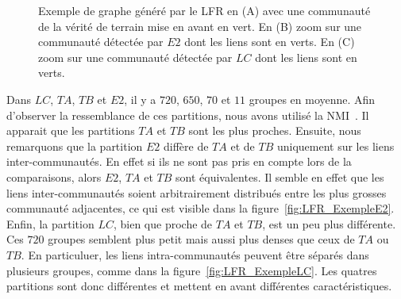 \begin{figure}
\centering

	\caption{Exemple de graphe généré par le LFR en (A) avec une communauté de la vérité de terrain mise en avant en vert.
	En (B) zoom sur une communauté détectée par $E2$ dont les liens sont en verts.
	En (C) zoom sur une communauté détectée par $LC$ dont les liens sont en verts. }
	\label{fig:LFR_Exemple}
\end{figure}


Dans $LC$, $TA$, $TB$ et $E2$, il y a $720$, $650$, $70$ et $11$ groupes en moyenne.
Afin d'observer la ressemblance de ces partitions, nous avons utilisé la NMI~\cite{Danon2005}.
Il apparait que les partitions $TA$ et $TB$ sont les plus proches.
Ensuite, nous remarquons que la partition $E2$ diffère de $TA$ et de $TB$ uniquement sur les liens inter-communautés.
En effet si ils ne sont pas pris en compte lors de la comparaisons, alors $E2$, $TA$ et $TB$ sont équivalentes.
Il semble en effet que les liens inter-communautés soient arbitrairement distribués entre les plus grosses communauté adjacentes, ce qui est visible dans la figure~\ref{fig:LFR_ExempleE2}.
Enfin, la partition $LC$, bien que proche de $TA$ et $TB$, est un peu plus différente.
Ces $720$ groupes semblent plus petit mais aussi plus denses que ceux de $TA$ ou $TB$.
En particuluer, les liens intra-communautés peuvent être séparés dans plusieurs groupes, comme dans la figure~\ref{fig:LFR_ExempleLC}.
Les quatres partitions sont donc différentes et mettent en avant différentes caractéristiques.

